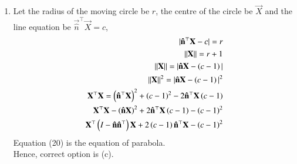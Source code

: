 \documentclass[journal]{IEEEtran}
\begin{document}
\begin{enumerate}
\item Let the radius of the moving circle be $r$, the centre of the circle be $\vec{X}$ and the line equation be $\vec{\hat{n}}^\top\vec{X}=c$,
\begin{align}
    |\mathbf{\hat{n}}^\top\mathbf{X}-c|=r\\
    ||\mathbf{X}||=r+1\\
    ||\mathbf{X}||=|\mathbf{\hat{n}}\mathbf{X}-\left(c-1\right)|\\
    ||\mathbf{X}||^2=|\mathbf{\hat{n}}\mathbf{X}-\left(c-1\right)|^2\\
    \mathbf{X}^\top\mathbf{X}=\left(\mathbf{\hat{n}^\top\mathbf{X}}\right)^2+\left(c-1\right)^2-2\mathbf{\hat{n}}^\top\mathbf{X}\left(c-1\right)\\
    \mathbf{X}^\top\mathbf{X}-\left(\mathbf{\hat{n}}\mathbf{X}\right)^2+2\mathbf{\hat{n}^\top\mathbf{X}}\left(c-1\right)-\left(c-1\right)^2\\
    \mathbf{X}^\top\left(I-\mathbf{\hat{n}}\mathbf{\hat{n}}^\top\right)\mathbf{X}+2\left(c-1\right)\mathbf{\hat{n}^\top\mathbf{X}}-\left(c-1\right)^2
\end{align}
Equation (20) is the equation of parabola.\\
Hence, correct option is (c).


\end{enumerate}
\end{document}
